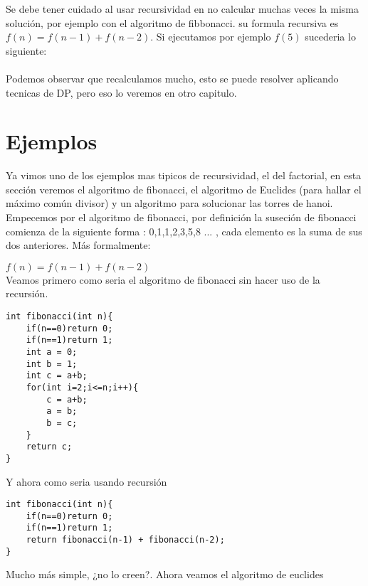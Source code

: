 Se debe tener cuidado al usar recursividad en no calcular muchas veces la misma solución, por ejemplo
con el algoritmo de fibbonacci. su formula recursiva es $f(n) = f(n-1) + f(n-2)$. Si ejecutamos por ejemplo $f(5)$ sucederia lo siguiente:
\\
\\Podemos observar que recalculamos mucho, esto se puede resolver aplicando tecnicas de DP, pero eso lo veremos en otro capitulo.

\section{Ejemplos}

Ya vimos uno de los ejemplos mas tipicos de recursividad, el del factorial, en esta sección veremos
el algoritmo de fibonacci, el algoritmo de Euclides (para hallar el máximo común divisor) y 
un algoritmo para solucionar las torres de hanoi.
\\Empecemos por el algoritmo de fibonacci, por definición la suseción de fibonacci comienza de la 
siguiente forma : 0,1,1,2,3,5,8 ... , cada elemento es la suma de sus dos anteriores. Más  formalmente:

$f(n) = f(n-1) + f(n-2)$
\\Veamos primero como seria el algoritmo de fibonacci sin hacer uso de la recursión.

\begin{minipage}{\textwidth}
\begin{lstlisting}[style=C,caption=fibonacciIterativo.cpp]
int fibonacci(int n){
    if(n==0)return 0;
    if(n==1)return 1;
    int a = 0;
    int b = 1;
    int c = a+b;
    for(int i=2;i<=n;i++){
        c = a+b;
        a = b;
        b = c;
    }
    return c;
}
\end{lstlisting}
\end{minipage}

Y ahora como seria usando recursión

\begin{minipage}{\textwidth}
\begin{lstlisting}[style=C,caption=fibonacciRecursivo.cpp]
int fibonacci(int n){
    if(n==0)return 0;
    if(n==1)return 1;
    return fibonacci(n-1) + fibonacci(n-2);
}
\end{lstlisting}
\end{minipage}

Mucho más simple, ¿no lo creen?. Ahora veamos el algoritmo de euclides

